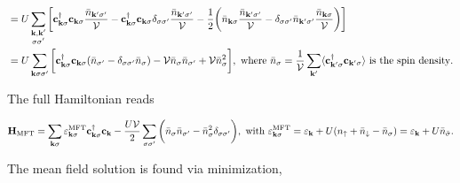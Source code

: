 \begin{align*}
          &= U \sum_{\substack{{\bf k}, {\bf k}'\\
          {\sigma \sigma'}}} \bigg[ {\bf c}_{{\bf k}\sigma}^\dagger {\bf c}_{{\bf k}\sigma} \frac{\bar{n}_{{\bf k'} \sigma'}}{\mathcal{V}} - {\bf c}_{{\bf k}\sigma}^\dagger {\bf c}_{{\bf k}\sigma} \delta_{\sigma \sigma'} \frac{\bar{n}_{{\bf k'} \sigma'}}{\mathcal{V}} - \frac{1}{2} \bigg(\bar{n}_{{\bf k} \sigma} \frac{\bar{n}_{{\bf k'} \sigma'}}{\mathcal{V}} - \delta_{\sigma \sigma'} \bar{n}_{{\bf k'} \sigma'} \frac{\bar{n}_{{\bf k} \sigma}}{\mathcal{V}} \bigg)\bigg] \\
          &= U \sum_{{\bf k} \sigma \sigma'} \bigg[{\bf c}_{{\bf k}\sigma}^\dagger {\bf c}_{{\bf k}\sigma} (\bar{n}_{\sigma'} - \delta_{\sigma \sigma'} \bar{n}_{\sigma}) - \mathcal{V} \bar{n}_{\sigma} \bar{n}_{\sigma'} + \mathcal{V} \bar{n}_{\sigma}^2   \bigg], \textnormal{ where } \bar{n}_{\sigma} = \frac{1}{\mathcal{V}} \sum_{{\bf k'}} \langle {\bf c}_{{\bf k'}\sigma}^\dagger {\bf c}_{{\bf k'}\sigma} \rangle \textnormal{ is the spin density}.
\end{align*}

The full Hamiltonian reads

\begin{equation}
    {\bf H}_{\textnormal{MFT}} = \sum_{{\bf k} \sigma} \varepsilon_{{\bf k} \sigma}^{\textnormal{MFT}} {\bf c}_{{\bf k}\sigma}^\dagger {\bf c}_{{\bf k}} - \frac{U \mathcal{V}}{2} \sum_{\sigma \sigma'} \bigg( \bar{n}_{\sigma} \bar{n}_{\sigma'} - \bar{n}_{\sigma}^2 \delta_{\sigma \sigma'} \bigg), \textnormal{ with } \varepsilon_{{\bf k} \sigma}^{\textnormal{MFT}} = \varepsilon_{{\bf k}} + U(n_\uparrow + {\bar n}_\downarrow - \bar{n}_\sigma) = \varepsilon_{\bf k} + U\bar{n}_{\bar{\sigma}}.
\end{equation}

The mean field solution is found via minimization, 

